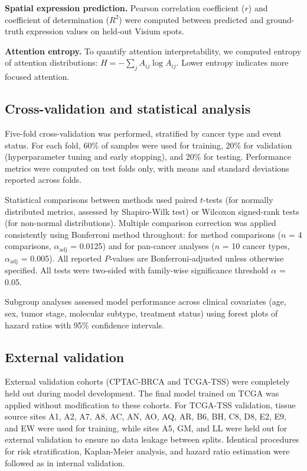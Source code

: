 \documentclass[pdflatex,sn-nature]{sn-jnl}%
\theoremstyle{thmstyleone}%
\theoremstyle{thmstyletwo}%
\theoremstyle{thmstylethree}%
\begin{document}
\textbf{Spatial expression prediction.} Pearson correlation coefficient ($r$) and coefficient of determination ($R^2$) were computed between predicted and ground-truth expression values on held-out Visium spots.

\textbf{Attention entropy.} To quantify attention interpretability\cite{bib65}, we computed entropy of attention distributions: $H = -\sum_j A_{ij} \log A_{ij}$. Lower entropy indicates more focused attention.

\subsection{Cross-validation and statistical analysis}

Five-fold cross-validation was performed, stratified by cancer type and event status. For each fold, 60\% of samples were used for training, 20\% for validation (hyperparameter tuning and early stopping), and 20\% for testing. Performance metrics were computed on test folds only, with means and standard deviations reported across folds.

Statistical comparisons between methods used paired $t$-tests (for normally distributed metrics, assessed by Shapiro-Wilk test) or Wilcoxon signed-rank tests (for non-normal distributions). Multiple comparison correction was applied consistently using Bonferroni method throughout: for method comparisons ($n$ = 4 comparisons, $\alpha_{\text{adj}}$ = 0.0125) and for pan-cancer analyses ($n$ = 10 cancer types, $\alpha_{\text{adj}}$ = 0.005). All reported $P$-values are Bonferroni-adjusted unless otherwise specified. All tests were two-sided with family-wise significance threshold $\alpha$ = 0.05.

Subgroup analyses assessed model performance across clinical covariates (age, sex, tumor stage, molecular subtype, treatment status) using forest plots of hazard ratios with 95\% confidence intervals.

\subsection{External validation}

External validation cohorts (CPTAC-BRCA and TCGA-TSS) were completely held out during model development. The final model trained on TCGA was applied without modification to these cohorts. For TCGA-TSS validation, tissue source sites A1, A2, A7, A8, AC, AN, AO, AQ, AR, B6, BH, C8, D8, E2, E9, and EW were used for training, while sites A5, GM, and LL were held out for external validation to ensure no data leakage between splits. Identical procedures for risk stratification, Kaplan-Meier analysis, and hazard ratio estimation were followed as in internal validation.
\end{document}
